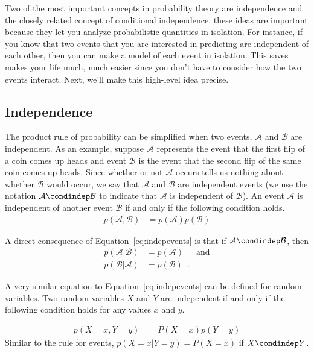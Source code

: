 \documentclass[assignment02_Solutions]{subfiles}
\begin{document}
Two of the most important concepts in probability theory are independence and the closely related concept of conditional independence.  these ideas are important because they let you analyze probabilistic quantities in isolation.  For instance, if you know that two events that you are interested in predicting are independent of each other, then you can make a model of each event in isolation.  This saves makes your life much, much easier since you don't have to consider how the two events interact.  Next, we'll make this high-level idea precise.

\subsection{Independence}
The product rule of probability can be simplified when two events, $\mathcal{A}$ and $\mathcal{B}$ are independent.  As an example, suppose $\mathcal{A}$ represents the event that the first flip of a coin comes up heads and event $\mathcal{B}$ is the event that the second flip of the same coin comes up heads.  Since whether or not $\mathcal{A}$ occurs tells us nothing about whether $\mathcal{B}$ would occur, we say that $\mathcal{A}$ and $\mathcal{B}$ are independent events (we use the notation $\mathcal{A} \condindep \mathcal{B}$ to indicate that $\mathcal{A}$ is independent of $\mathcal{B}$).  An event $\mathcal{A}$ is independent of another event $\mathcal{B}$ if and only if the following condition holds.
\begin{align}
p(\mathcal{A}, \mathcal{B}) &= p(\mathcal{A}) p(\mathcal{B}) \label{eq:indepevents}
\end{align}

A direct consequence of Equation~\ref{eq:indepevents} is that if $\mathcal{A} \condindep \mathcal{B}$, then
\begin{align}
p(\mathcal{A} | \mathcal{B}) &= p(\mathcal{A}) & \mbox{and} \nonumber \\
p(\mathcal{B} | \mathcal{A}) &= p(\mathcal{B}) \enspace . \nonumber
\end{align}

A very similar equation to Equation~\ref{eq:indepevents} can be defined for random variables.  Two random variables $X$ and $Y$ are independent if and only if the following condition holds for any values $x$ and $y$.

\begin{align}
p(X=x, Y=y) &= P(X=x) p(Y=y)
\end{align}
Similar to the rule for events, $p(X=x | Y=y) = P(X=x)$ if $X \condindep Y$.
\end{document}
